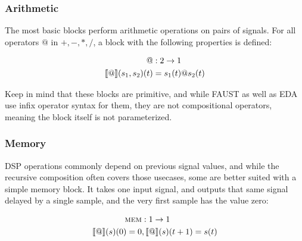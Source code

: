 \subsubsection{Arithmetic}
\label{sec:block_arithmetic}
The most basic blocks perform arithmetic operations on pairs of signals. For all operators
$@$ in ${+, -, *, /}$, a block with the following properties is defined:

\begin{minipage}{0.5\linewidth}
  \begin{align*}
    @                     & : 2 \rightarrow 1 \\
    \llbracket @ \rrbracket(s_1, s_2)(t) & = s_1(t) @ s_2(t) \\
  \end{align*}
\end{minipage}
\begin{minipage}{0.5\linewidth}
  \begin{figure}[H]
    \centering
    \label{fig:block_arithmetic}
    
  \end{figure}
\end{minipage}

Keep in mind that these blocks are primitive, and while FAUST as well as EDA use infix operator syntax for
them, they are not compositional operators, meaning the block itself is not parameterized.

\subsubsection{Memory}

DSP operations commonly depend on previous signal values, and while the recursive composition often covers
those usecases, some are better suited with a simple memory block. It takes one input signal, and outputs
that same signal delayed by a single sample, and the very first sample has the value zero:

\begin{minipage}{0.5\linewidth}
  \begin{align*}
    \textsc{mem}               & : 1 \rightarrow 1           \\
    \llbracket @ \rrbracket(s)(0) = 0 & , \llbracket @ \rrbracket(s)(t + 1) = s(t) \\
  \end{align*}
\end{minipage}
\begin{minipage}{0.5\linewidth}
  \begin{figure}[H]
    \centering
    \label{fig:block_mem}
    
  \end{figure}
\end{minipage}

